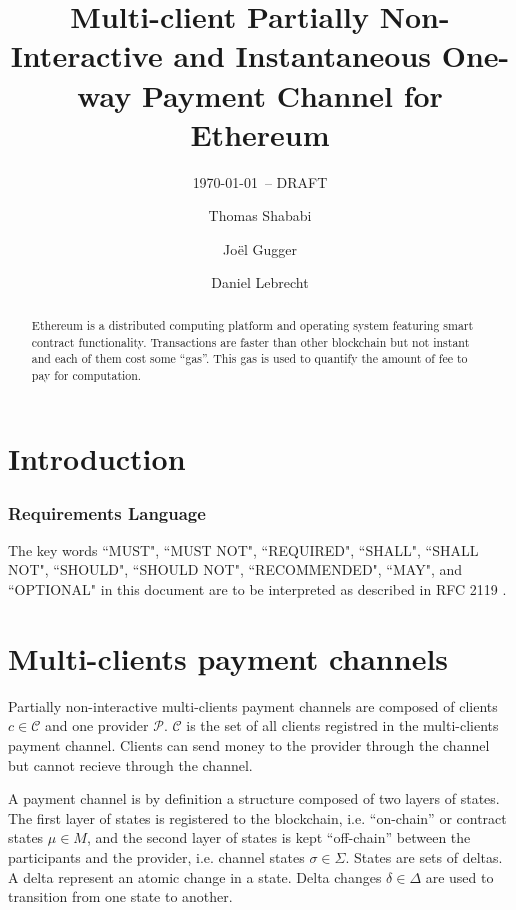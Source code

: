 \documentclass{llncs}
\begin{document}
\title{Multi-client Partially Non-Interactive and Instantaneous One-way Payment Channel for Ethereum}
\author{Thomas Shababi \and Jo\"el Gugger \and Daniel Lebrecht}

\subtitle{{\normalsize\today{\small\ -- DRAFT}}}

\maketitle

\begin{abstract} Ethereum is a distributed computing platform and operating system featuring smart contract functionality. Transactions are faster than other blockchain but not instant and each of them cost some ``gas''. This gas is used to quantify the amount of fee to pay for computation. 
\end{abstract}

\section{Introduction}

\subsubsection{Requirements Language}
The key words ``MUST", ``MUST NOT", ``REQUIRED", ``SHALL", ``SHALL NOT",
``SHOULD", ``SHOULD NOT", ``RECOMMENDED", ``MAY", and ``OPTIONAL" in this
document are to be interpreted as described in RFC 2119 \cite{Bradner1997}.

\section{Multi-clients payment channels} Partially non-interactive multi-clients payment channels are composed of clients $c \in \mathcal{C}$ and one provider $\mathcal{P}$. $\mathcal{C}$ is the set of all clients registred in the multi-clients payment channel. Clients can send money to the provider through the channel but cannot recieve through the channel.

A payment channel is by definition a structure composed of two layers of states. The first layer of states is registered to the blockchain, i.e. ``on-chain'' or contract states $\mu \in M$, and the second layer of states is kept ``off-chain'' between the participants and the provider, i.e. channel states $\sigma \in \Sigma$. States are sets of deltas. A delta represent an atomic change in a state. Delta changes $\delta \in \Delta$ are used to transition from one state to another.
\end{document}
